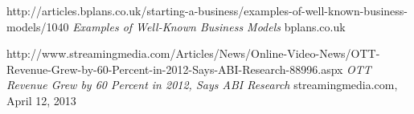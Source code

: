 \begin{thebibliography}{9}
		http://articles.bplans.co.uk/starting-a-business/examples-of-well-known-business-models/1040\newline
		\emph{Examples of Well-Known Business Models}\newline
		bplans.co.uk

		http://www.streamingmedia.com/Articles/News/Online-Video-News/OTT-Revenue-Grew-by-60-Percent-in-2012-Says-ABI-Research-88996.aspx\newline
		\emph{OTT Revenue Grew by 60 Percent in 2012, Says ABI Research}\newline
		streamingmedia.com, April 12, 2013

\end{thebibliography}
